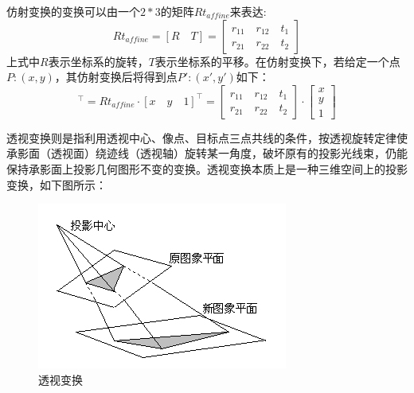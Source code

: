 仿射变换的变换可以由一个$2*3$的矩阵$Rt_{affine}$来表达:
\begin{equation}
	Rt_{affine}=\left[R\quad T\right]=
	\left[
	\begin{aligned}
	r_{11}\quad r_{12}\quad t_1 \\
	r_{21}\quad r_{22}\quad t_2
	\end{aligned}
	\right]
\end{equation}
上式中$R$表示坐标系的旋转，$T$表示坐标系的平移。在仿射变换下，若给定一个点$P:(x,y)$，其仿射变换后将得到点$P':(x',y')$如下：
\begin{equation}
	[x'\quad y']^\top=Rt_{affine}\cdot [x\quad y\quad 1]^\top=
	\left[
	\begin{aligned}
	r_{11}\quad r_{12}\quad t_1 \\
	r_{21}\quad r_{22}\quad t_2
	\end{aligned}
	\right]\cdot 
	\left[
	\begin{aligned}
	x \\
	y \\
	1
	\end{aligned}
	\right]
\end{equation}
		
透视变换则是指利用透视中心、像点、目标点三点共线的条件，按透视旋转定律使承影面（透视面）绕迹线（透视轴）旋转某一角度，破坏原有的投影光线束，仍能保持承影面上投影几何图形不变的变换。透视变换本质上是一种三维空间上的投影变换，如下图所示：
\begin{figure}[htb]
	\centering 
	\includegraphics[scale=1.0]{./mypic/透视变换.jpg} 
	\caption{透视变换} 
\end{figure}


